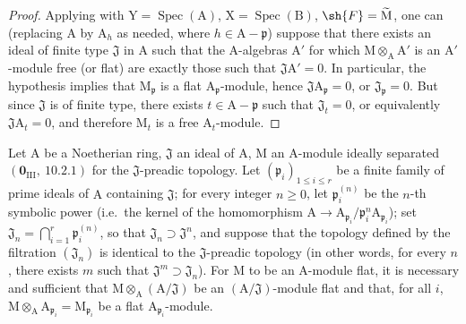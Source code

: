 \begin{proof}
Applying  with $\mathrm{Y}=\operatorname{Spec}(\mathrm{A})$, $\mathrm{X}=\operatorname{Spec}(\mathrm{B})$, $\sh{F}=\widetilde{\mathrm{M}}$, one can (replacing
$\mathrm{A}$ by $\mathrm{A}_h$ as needed, where $h\in\mathrm{A}-\mathfrak{p}$) suppose that there exists an ideal of finite type $\mathfrak{J}$ in $\mathrm{A}$
such that the $\mathrm{A}$-algebras $\mathrm{A}'$ for which $\mathrm{M}\otimes_\mathrm{A}\mathrm{A}'$ is an $\mathrm{A}'$-module free (or flat) are
exactly those such that $\mathfrak{J}\mathrm{A}'=0$. In particular, the hypothesis implies that $\mathrm{M}_\mathfrak{p}$ is a flat
$\mathrm{A}_\mathfrak{p}$-module, hence $\mathfrak{J}\mathrm{A}_\mathfrak{p}=0$, or $\mathfrak{J}_\mathfrak{p}=0$. But since $\mathfrak{J}$ is of finite type, there
exists $t\in\mathrm{A}-\mathfrak{p}$ such that $\mathfrak{J}_t=0$, or equivalently $\mathfrak{J}\mathrm{A}_t=0$, and therefore $\mathrm{M}_t$ is a free $\mathrm{A}_t$-module.
\end{proof}

\begin{proposition}[11.4.7]
\label{IV.11.4.7}
Let $\mathrm{A}$ be a Noetherian ring, $\mathfrak{J}$ an ideal of $\mathrm{A}$, $\mathrm{M}$ an $\mathrm{A}$-module
ideally separated $(\mathbf{0}_{\mathrm{III}},~10.2.1)$ for the $\mathfrak{J}$-preadic topology. Let $(\mathfrak{p}_i)_{1\leq i\leq r}$ be a finite family
of prime ideals of $\mathrm{A}$ containing $\mathfrak{J}$; for every integer $n\geq 0$, let $\mathfrak{p}_i^{(n)}$ be the $n$-th symbolic
power (i.e.\ the kernel of the homomorphism $\mathrm{A}\to\mathrm{A}_{\mathfrak{p}_i}/\mathfrak{p}_i^n\mathrm{A}_{\mathfrak{p}_i}$); set $\mathfrak{J}_n=\bigcap_{i=1}^{r}\mathfrak{p}_i^{(n)}$, so that $\mathfrak{J}_n\supset\mathfrak{J}^n$,
and suppose that the topology defined by the filtration $(\mathfrak{J}_n)$ is identical to the $\mathfrak{J}$-preadic topology
(in other words, for every $n$, there exists $m$ such that $\mathfrak{J}^m\supset\mathfrak{J}_n$). For $\mathrm{M}$ to be an $\mathrm{A}$-module flat,
it is necessary and sufficient that $\mathrm{M}\otimes_\mathrm{A}(\mathrm{A}/\mathfrak{J})$ be an $(\mathrm{A}/\mathfrak{J})$-module flat and that, for all $i$, $\mathrm{M}\otimes_\mathrm{A}\mathrm{A}_{\mathfrak{p}_i}=\mathrm{M}_{\mathfrak{p}_i}$
be a flat $\mathrm{A}_{\mathfrak{p}_i}$-module.
\end{proposition}

